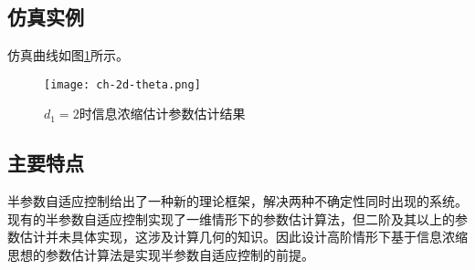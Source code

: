 \subsection{仿真实例}\label{subset:2.3.5}
仿真曲线如图\ref{fig.2d.theta}所示。
\begin{figure}
	\centering
	\texttt{[image: ch-2d-theta.png]}\\	 %
	\caption{$d_{1}=2$时信息浓缩估计参数估计结果}
	\label{fig.2d.theta}
\end{figure}
\subsection{主要特点}
半参数自适应控制给出了一种新的理论框架，解决两种不确定性同时出现的系统。现有的半参数自适应控制实现了一维情形下的参数估计算法，但二阶及其以上的参数估计并未具体实现，这涉及计算几何的知识。因此设计高阶情形下基于信息浓缩思想的参数估计算法是实现半参数自适应控制的前提。